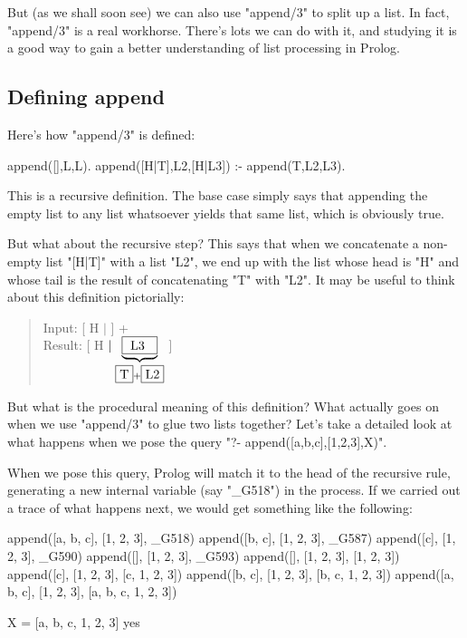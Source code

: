 But (as we shall soon see) we can also use "append/3" to split up a
list.  In fact, "append/3" is a real workhorse.  There's lots we
can do with it, and studying it is a good way to gain a better
understanding of list processing in Prolog.

\subsection*{Defining append}\label{SUBSEC.L6.DEFINING.APPEND}



Here's how "append/3" is defined:
\begin{LPNcodedisplay}
append([],L,L).
append([H|T],L2,[H|L3]) :- append(T,L2,L3).
\end{LPNcodedisplay}

This is a recursive definition. The base case simply says that
appending the empty list to any list whatsoever yields that same list,
which is obviously true.

But what about the recursive step?  This says that when we concatenate
a non-empty list "[H|T]" with a list "L2", we end up with
the list whose head is "H" and whose tail is the result of
concatenating "T" with "L2". It may be useful to think about
this definition pictorially:


\begin{quote}
Input:  [ H $\mid$  ] +  \\[5mm]
Result: [ H $\mid \underbrace{\fbox{\ L3 \ }}_{\fbox{T}+\fbox{L2}}$ ]
\end{quote}








But what is the procedural meaning of this definition?  What actually
goes on when we use "append/3" to glue two lists together?
Let's take a detailed look at what happens when we pose the query
"?- append([a,b,c],[1,2,3],X)".

When we pose this query, Prolog will match it to the
head of the recursive rule, generating a new internal variable
(say "\_G518") in the process. If we carried out a trace of what
happens next, we would get something like the following:

\begin{LPNcodedisplay}
append([a, b, c], [1, 2, 3], _G518)
append([b, c], [1, 2, 3], _G587)
append([c], [1, 2, 3], _G590)
append([], [1, 2, 3], _G593)
append([], [1, 2, 3], [1, 2, 3])
append([c], [1, 2, 3], [c, 1, 2, 3])
append([b, c], [1, 2, 3], [b, c, 1, 2, 3])
append([a, b, c], [1, 2, 3], [a, b, c, 1, 2, 3])

X = [a, b, c, 1, 2, 3]
yes
\end{LPNcodedisplay}

